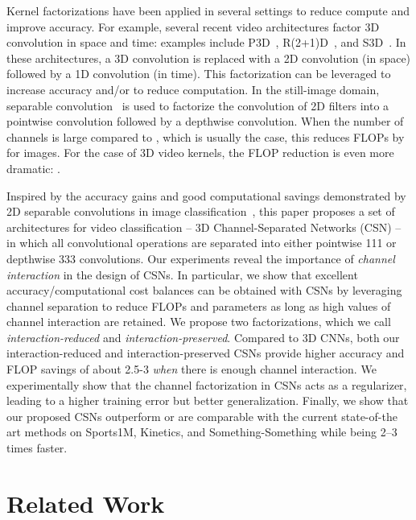 \documentclass[10pt,twocolumn,letterpaper]{article}
\begin{document}
Kernel factorizations have been applied in several settings to reduce compute and improve accuracy.  For example, several recent video architectures factor 3D convolution in space and time: examples include P3D~\cite{P3D}, R(2+1)D~\cite{Tran18}, and S3D~\cite{xie2017rethinking}.  In these architectures, a 3D convolution is replaced with a 2D convolution (in space) followed by a 1D convolution (in time). This factorization can be leveraged to increase accuracy and/or to reduce computation. In the still-image domain, separable convolution~\cite{Xception} is used to factorize the convolution of 2D  filters into a pointwise  convolution followed by a depthwise  convolution.  When the number of channels is large compared to , which is usually the case, this reduces FLOPs by  for images. For the case of 3D video kernels, the FLOP reduction is even more dramatic: .


Inspired by the accuracy gains and good computational savings demonstrated by 2D separable convolutions in image classification~\cite{Xception,MobileNet,ShuffleNet}, this paper proposes a set of architectures for video classification -- 3D Channel-Separated Networks (CSN) -- in which all convolutional operations are separated into either pointwise 111 or depthwise 333 convolutions. Our experiments reveal the importance of {\it channel interaction} in the design of CSNs. In particular, we show that excellent accuracy/computational cost balances can be obtained with CSNs by leveraging channel separation to reduce FLOPs and parameters as long as high values of channel interaction are retained.  We propose two factorizations, which we call {\it interaction-reduced} and {\it interaction-preserved}. Compared to 3D CNNs, both our interaction-reduced and interaction-preserved CSNs provide higher accuracy and FLOP savings of about 2.5-3 {\em when} there is enough channel interaction. We experimentally show that the channel factorization in CSNs acts as a regularizer, leading to a higher training error but better generalization. Finally, we show that our proposed CSNs outperform or are comparable with the current state-of-the art methods on Sports1M, Kinetics, and Something-Something while being 2--3 times faster. 
\section{Related Work}
\label{sec:related_work}
\end{document}
